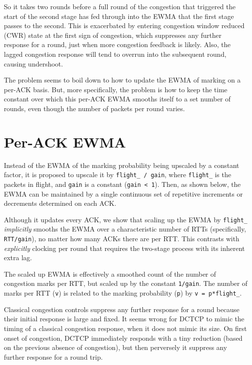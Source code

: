 So it takes two rounds before a full round of the congestion that triggered the
start of the second stage has fed through into the EWMA that the first stage
passes to the second. This is exacerbated by entering congestion window reduced
(CWR) state at the first sign of congestion, which suppresses any further
response for a round, just when more congestion feedback is likely. Also, the
lagged congestion response will tend to overrun into the subsequent round,
causing undershoot.

The problem seems to boil down to how to update the EWMA of marking on a per-ACK
basis. But, more specifically, the problem is how to keep the time constant over
which this per-ACK EWMA smooths itself to a set number of rounds, even though
the number of packets per round varies.

\section{Per-ACK EWMA}\label{prresp_Per-Packet_EWMA}

Instead of the EWMA of the marking probability being upscaled by a constant
factor, it is proposed to upscale it by \texttt{flight\_ / gain}, where
\texttt{flight\_} is the packets in flight, and \texttt{gain} is a constant
(\texttt{gain < 1}). Then, as shown below, the EWMA can be maintained by a
single continuous set of repetitive increments or decrements determined on each
ACK.

Although it updates every ACK, we show that scaling up the EWMA by
\texttt{flight\_} \emph{implicitly} smooths the EWMA over a characteristic
number of RTTs (specifically, \texttt{RTT/gain}), no matter how many ACKs there
are per RTT. This contrasts with \emph{explicitly} clocking per
round that requires the two-stage process with its inherent extra lag.

The scaled up EWMA is effectively a smoothed count of the number of congestion
marks per RTT, but scaled up by the constant \texttt{1/gain}. The number of
marks per RTT (\texttt{v}) is related to the marking probability (\texttt{p}) by
\texttt{v = p*flight\_}.

Classical congestion controls suppress any further response for a round because
their initial response is large and fixed. It seems wrong for DCTCP to mimic the
timing of a classical congestion response, when it does not mimic its size. On
first onset of congestion, DCTCP immediately responds with a tiny reduction
(based on the previous absence of congestion), but then perversely it suppress
any further response for a round trip.

